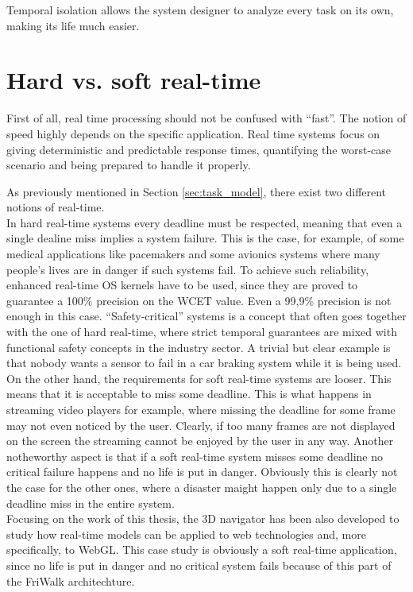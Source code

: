 Temporal isolation allows the system designer to analyze every
task on its own, making its life much easier.


\section{Hard vs. soft real-time}
First of all, real time processing should not be confused with ``fast''. The notion
of speed highly depends on the specific application. Real time systems focus on
giving deterministic and predictable response times, quantifying the worst-case
scenario and being prepared to handle it properly.

As previously mentioned in Section \ref{sec:task_model}, there exist two different
notions of real-time.\\
In hard real-time systems every deadline must be respected, meaning
that even a single dealine miss implies a system failure. This is the case, for
example, of some medical applications like pacemakers and some avionics systems
where many people's lives are in danger if such systems fail. To achieve such
reliability, enhanced real-time OS kernels have to be used, since they are proved
to guarantee a 100\% precision on the WCET value. Even a 99,9\% precision is not
enough in this case. ``Safety-critical'' systems is a concept that often goes
together with the one of hard real-time, where strict temporal guarantees are
mixed with functional safety concepts in the industry sector. A trivial but clear
example is that nobody wants a sensor to fail in a car braking system while
it is being used.\\
On the other hand, the requirements for soft real-time systems are looser. This
means that it is acceptable to miss some deadline.
This is what happens in streaming video players for example, where missing the
deadline for some frame may not even noticed by the user. Clearly, if too many
frames are not displayed on the screen the streaming cannot be enjoyed by the
user in any way. Another notheworthy aspect is that if a soft real-time system
misses some deadline no critical failure happens and no life is put in danger.
Obviously this is clearly not the case for the other ones, where a disaster
maight happen only due to a single deadline miss in the entire system.\\
Focusing on the work of this thesis, the 3D navigator has been also developed 
to study how
real-time models can be applied to web technologies and, more specifically, to
WebGL. This case study is obviously a soft real-time application, since
no life is put in danger and no critical system fails because of this part of
the FriWalk architechture.
